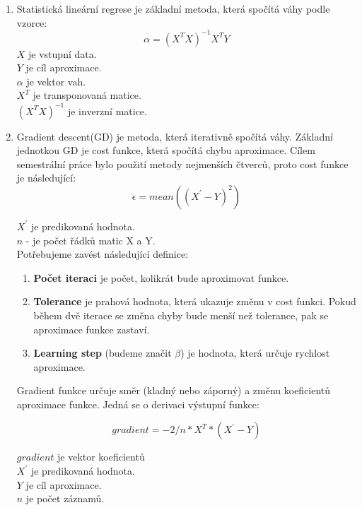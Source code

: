 \documentclass[czech]{pyt-report}
\begin{document}
\begin{enumerate}
\item Statistická lineární regrese je základní metoda, která spočítá váhy podle vzorce\cite{lin_reg}:
\begin{equation}
\alpha = (X^T X)^{-1} X^T Y
\end{equation}
$X$ je vstupní data. \\
$Y$ je cíl aproximace. \\
$\alpha$ je vektor vah. \\
$X^T$ je transponovaná matice. \\
$(X^T X)^{-1}$ je inverzní matice. \\
\item Gradient descent(GD) je metoda, která  iterativně spočítá váhy. Základní jednotkou GD je cost funkce, která spočítá chybu aproximace. Cílem semestrální práce bylo použití metody nejmenších čtverců, proto cost funkce je následující:
\begin{equation}
\epsilon = mean((X^{'} - Y)^2)
\end{equation}

$X^{'}$ je predikovaná hodnota. \\
$n$ - je počet řádků matic X a Y.\\

Potřebujeme zavést následující definice:

\begin{enumerate}
\item \textbf{Počet iteraci} je počet, kolikrát bude aproximovat funkce.
\item \textbf{Tolerance} je prahová hodnota, která ukazuje změnu v cost funkci. Pokud během dvě iterace se změna chyby bude menší než tolerance, pak se aproximace funkce zastaví.
\item \textbf{Learning step} (budeme značit $\beta$) je hodnota, která určuje rychlost aproximace.
\end{enumerate}

Gradient funkce určuje směr (kladný nebo záporný) a změnu koeficientů aproximace funkce. Jedná se o derivaci výstupní funkce:

\begin{equation}
gradient = - 2/n *  X^T * (X^{'} - Y)
\end{equation}

$gradient$ je vektor koeficientů \\
$X^{'}$ je predikovaná hodnota. \\
$Y$ je cíl aproximace. \\
$n$ je počet záznamů. \\


\end{enumerate}
\end{document}
